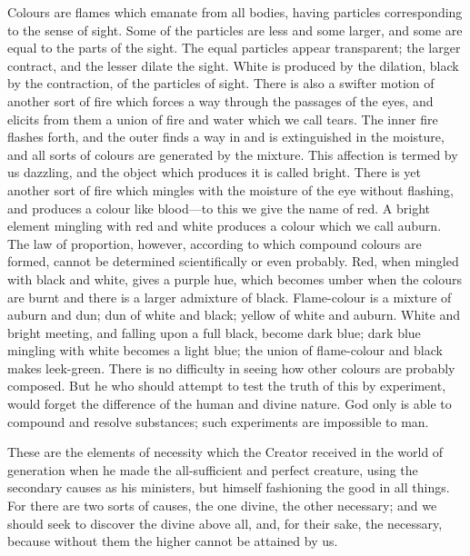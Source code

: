 Colours are flames which emanate from all bodies, having particles
corresponding to the sense of sight. Some of the particles are less and
some larger, and some are equal to the parts of the sight. The equal
particles appear transparent; the larger contract, and the lesser dilate
the sight. White is produced by the dilation, black by the contraction, of
the particles of sight. There is also a swifter motion of another sort of
fire which forces a way through the passages of the eyes, and elicits from
them a union of fire and water which we call tears. The inner fire flashes
forth, and the outer finds a way in and is extinguished in the moisture,
and all sorts of colours are generated by the mixture. This affection is
termed by us dazzling, and the object which produces it is called bright.
There is yet another sort of fire which mingles with the moisture of the
eye without flashing, and produces a colour like blood—to this we
give the name of red. A bright element mingling with red and white
produces a colour which we call auburn. The law of proportion, however,
according to which compound colours are formed, cannot be determined
scientifically or even probably. Red, when mingled with black and white,
gives a purple hue, which becomes umber when the colours are burnt and
there is a larger admixture of black. Flame-colour is a mixture of auburn
and dun; dun of white and black; yellow of white and auburn. White and
bright meeting, and falling upon a full black, become dark blue; dark blue
mingling with white becomes a light blue; the union of flame-colour and
black makes leek-green. There is no difficulty in seeing how other colours
are probably composed. But he who should attempt to test the truth of this
by experiment, would forget the difference of the human and divine nature.
God only is able to compound and resolve substances; such experiments are
impossible to man.

These are the elements of necessity which the Creator received in the
world of generation when he made the all-sufficient and perfect creature,
using the secondary causes as his ministers, but himself fashioning the
good in all things. For there are two sorts of causes, the one divine, the
other necessary; and we should seek to discover the divine above all, and,
for their sake, the necessary, because without them the higher cannot be
attained by us.


